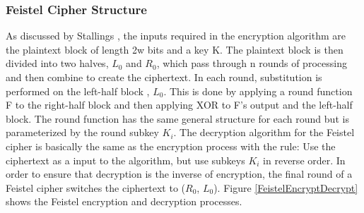 \documentclass{article}
\begin{document}
\subsubsection{Feistel Cipher Structure}
As discussed by Stallings \cite{stallings2011}, the inputs required in the encryption algorithm are the plaintext block of length 2w bits and a key K. The plaintext block is then divided into two halves, $L_{0}$ and $R_{0}$, which pass through n rounds of processing and then combine to create  the ciphertext. In each round, substitution is performed on the left-half block , $L_{0}$. This is done by applying a round function F to the right-half block and then applying XOR to F's output and the left-half block. The round function has the same general structure for each round but is parameterized by the round subkey $K_{i}$. The decryption algorithm for the Feistel cipher is basically the same as the encryption process with the rule: Use the ciphertext as a input to the algorithm, but use subkeys $K_{i}$  in reverse order. In order to ensure that decryption is the inverse of encryption, the final round of a Feistel cipher switches the ciphertext to ($R_{0}$, $L_{0}$). Figure \ref{FeistelEncryptDecrypt} shows the Feistel encryption and decryption processes.
\end{document}
